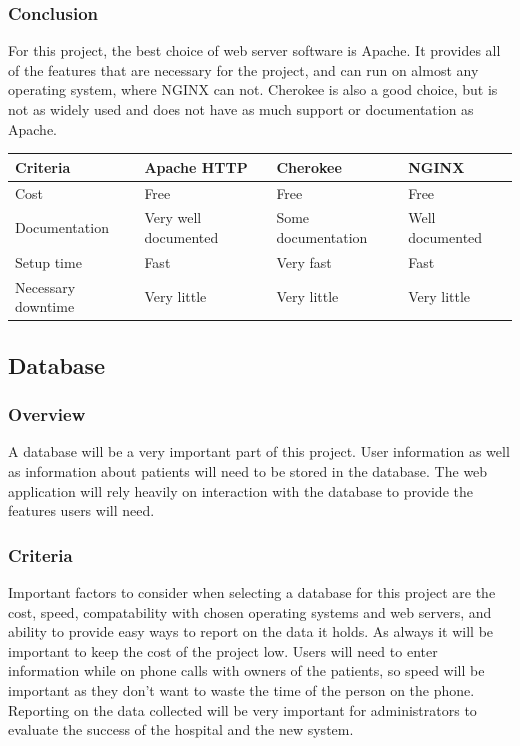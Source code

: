 \documentclass[onecolumn, draftclsnofoot,10pt, compsoc]{IEEEtran}
\begin{document}
\subsubsection{Conclusion}
For this project, the best choice of web server software is Apache. It provides all of the features that are necessary for the project, and can run on almost any operating system, where NGINX can not. Cherokee is also a good choice, but is not as widely used and does not have as much support or documentation as Apache.

\begin{table}[h!]
\centering
\begin{tabular}{ |l|l|l|l| } 
\hline
\textbf{Criteria} & \textbf{Apache HTTP} & \textbf{Cherokee} & \textbf{NGINX} \\ \hline
Cost & Free & Free & Free \\ \hline
Documentation & Very well documented & Some documentation & Well documented \\ \hline
Setup time & Fast & Very fast & Fast \\ \hline
Necessary downtime & Very little & Very little & Very little \\ \hline
\end{tabular}
\end{table}

\subsection{Database}

\subsubsection{Overview}
A database will be a very important part of this project. User information as well as information about patients will need to be stored in the database. The web application will rely heavily on interaction with the database to provide the features users will need.

\subsubsection{Criteria}
Important factors to consider when selecting a database for this project are the cost, speed, compatability with chosen operating systems and web servers, and ability to provide easy ways to report on the data it holds. As always it will be important to keep the cost of the project low. Users will need to enter information while on phone calls with owners of the patients, so speed will be important as they don't want to waste the time of the person on the phone. Reporting on the data collected will be very important for administrators to evaluate the success of the hospital and the new system.
\end{document}

